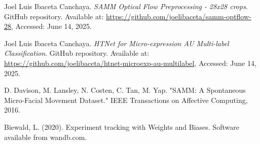 \documentclass[conference]{IEEEtran}
\begin{document}
\begin{thebibliography}{9}
Joel Luis Ibaceta Canchaya.
\newblock \emph{SAMM Optical Flow Preprocessing - 28x28 crops}.
\newblock GitHub repository. Available at: \url{https://github.com/joelibaceta/samm-optflow-28}, Accessed: June 14, 2025.

Joel Luis Ibaceta Canchaya.
\newblock \emph{HTNet for Micro-expression AU Multi-label Classification}.
\newblock GitHub repository. Available at: \url{https://github.com/joelibaceta/htnet-microexp-au-multilabel}, Accessed: June 14, 2025.

 D. Davison, M. Lansley, N. Costen, C. Tan, M. Yap. "SAMM: A Spontaneous Micro-Facial Movement Dataset." IEEE Transactions on Affective Computing, 2016.

 Biewald, L. (2020). Experiment tracking with Weights and Biases. Software available from wandb.com.

\end{thebibliography}
\end{document}

